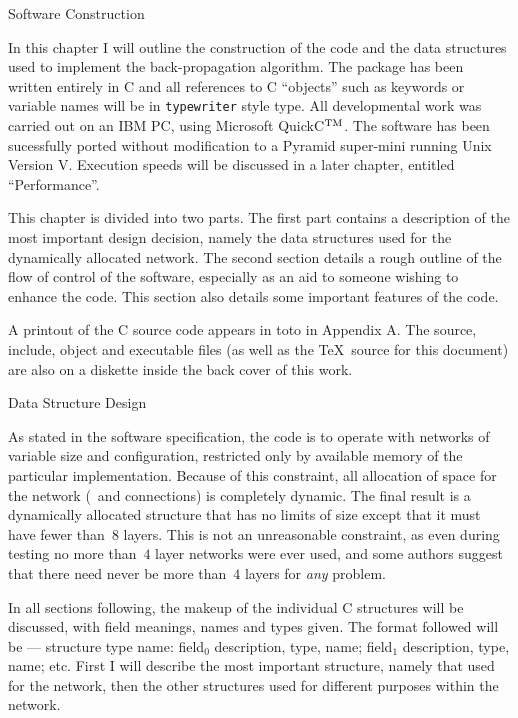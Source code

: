 \def\struct{{\tt struct}}
\def\LAYER{{\tt LAYER}}
\def\NEURON{{\tt NEURON}}
\def\WEIGHT{{\tt WEIGHT}}

\chap Software Construction

In this chapter I will outline the construction of the code and the
data structures used to implement the back-propagation algorithm.
The package has been written entirely in C and all references to C
``objects'' such as keywords or variable names
will be in {\tt typewriter} style type.
All developmental work was carried out on an IBM PC, using Microsoft
QuickC$^{\rm TM}$.
The software has been sucessfully ported without modification to a
Pyramid super-mini running Unix Version V.
Execution speeds will be discussed in a later chapter, entitled
``Performance''.

This chapter is divided into two parts.
The first part contains a description of the most important design
decision, namely the data structures used for the dynamically
allocated network.
The second section details a rough outline of the flow of control of
the software, especially as an aid to someone wishing to enhance the
code.
This section also details some important features of the code.

A printout of the C source code appears in toto in Appendix
A.
The source, include, object and executable files (as well as the
\TeX\ source for this document) are also on a diskette inside the
back cover of this work.

\sec Data Structure Design

As stated in the software specification, the code is to
operate with networks of variable size and configuration, restricted
only by available memory of the particular implementation.
Because of this constraint, all allocation of space for the network
(\neus\ and connections) is completely dynamic.
The final result is a dynamically allocated structure that has no
limits of size except that it must have fewer than~$8$ layers.
This is not an unreasonable constraint, as even during testing
no more than~$4$ layer networks were ever used, and some authors suggest
that there need
never be more than~$4$ layers for {\sl any} problem.

In all sections following, the makeup of the individual C structures
will be discussed, with field meanings, names and types given.
The format followed will be --- structure type name: field$_0$
description, type, name; field$_1$ description, type, name; etc.
First I will describe the most important structure, namely that used
for the network, then the other structures used for different
purposes within the network.

